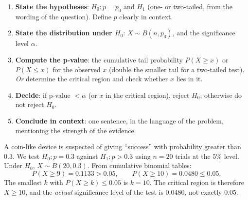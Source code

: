 \documentclass[11pt]{article}
\begin{document}
\begin{methode}
\begin{enumerate}
\item \textbf{State the hypotheses}: $H_0 : p = p_0$ and $H_1$ (one- or two-tailed, from the wording of the question). Define $p$ clearly in context.
\item \textbf{State the distribution under $H_0$}: $X \sim B(n, p_0)$, and the significance level $\alpha$.
\item \textbf{Compute the p-value}: the cumulative tail probability $P(X \geq x)$ or $P(X \leq x)$ for the observed $x$ (double the smaller tail for a two-tailed test). \emph{Or} determine the critical region and check whether $x$ lies in it.
\item \textbf{Decide}: if p-value $< \alpha$ (or $x$ in the critical region), reject $H_0$; otherwise do not reject $H_0$.
\item \textbf{Conclude in context}: one sentence, in the language of the problem, mentioning the strength of the evidence.
\end{enumerate}
\end{methode}

\begin{exemplebox}
A coin-like device is suspected of giving ``success'' with probability greater than $0.3$. We test $H_0 : p = 0.3$ against $H_1 : p > 0.3$ using $n = 20$ trials at the $5\%$ level. Under $H_0$, $X \sim B(20, 0.3)$. From cumulative binomial tables:
\[ P(X \geq 9) = 0.1133 > 0.05, \qquad P(X \geq 10) = 0.0480 \leq 0.05. \]
The smallest $k$ with $P(X \geq k) \leq 0.05$ is $k = 10$. The critical region is therefore $X \geq 10$, and the \emph{actual} significance level of the test is $0.0480$, not exactly $0.05$.
\end{exemplebox}
\end{document}

